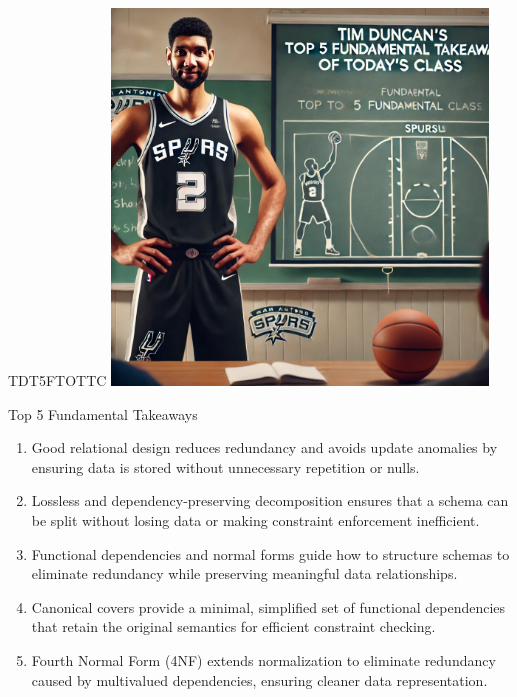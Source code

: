 \documentclass{beamer}
\begin{document}
\begin{frame}{TDT5FTOTTC}
    \centering
    \includegraphics[width=0.75\textwidth]{figures/tim.png}
\end{frame}

\begin{frame}{Top 5 Fundamental Takeaways}
    \small
    \begin{enumerate} \pause
        \item[5] Good relational design reduces redundancy and avoids update anomalies by ensuring data is stored without unnecessary repetition or nulls. \pause

        \item[4] Lossless and dependency-preserving decomposition ensures that a schema can be split without losing data or making constraint enforcement inefficient. \pause

        \item[3] Functional dependencies and normal forms guide how to structure schemas to eliminate redundancy while preserving meaningful data relationships. \pause

        \item[2] Canonical covers provide a minimal, simplified set of functional dependencies that retain the original semantics for efficient constraint checking. \pause

        \item[1] Fourth Normal Form (4NF) extends normalization to eliminate redundancy caused by multivalued dependencies, ensuring cleaner data representation.
    \end{enumerate}
\end{frame}
\end{document}
